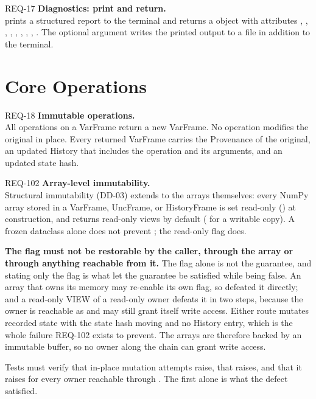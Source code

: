 \begin{reqbox}{REQ-17}{\stable}
\textbf{Diagnostics: print and return.}\\
 prints a structured report to the terminal
and returns a  object with attributes
, , , ,
, , , ,
. The optional  argument writes the
printed output to a  file in addition to the terminal.
\end{reqbox}

\section{Core Operations}

\begin{reqbox}{REQ-18}{\stable}
\textbf{Immutable operations.}\\
All operations on a VarFrame return a new VarFrame. No operation modifies
the original in place. Every returned VarFrame carries the Provenance of
the original, an updated History that includes the operation and its
arguments, and an updated state hash.
\end{reqbox}

\begin{reqbox}{REQ-102}{\stable}
\textbf{Array-level immutability.}\\
Structural immutability (DD-03) extends to the arrays themselves: every
NumPy array stored in a VarFrame, UncFrame, or HistoryFrame is set
read-only () at construction, and 
returns read-only views by default ( for a writable
copy). A frozen dataclass alone does not prevent
; the read-only flag does.

\textbf{The flag must not be restorable by the caller, through the array
or through anything reachable from it.} The flag alone is not the
guarantee, and stating only the flag is what let the guarantee be
satisfied while being false. An array that owns its memory may re-enable
its own flag, so  defeated it directly; and a
read-only VIEW of a read-only owner defeats it in two steps, because the
owner is reachable as  and may still grant itself
write access. Either route mutates recorded state with the state hash
moving and no History entry, which is the whole failure REQ-102 exists
to prevent. The arrays are therefore backed by an immutable buffer, so
no owner along the chain can grant write access.

Tests must verify that in-place mutation attempts raise, that
 raises, and that it raises for every owner
reachable through . The first alone is what the defect
satisfied.
\end{reqbox}

